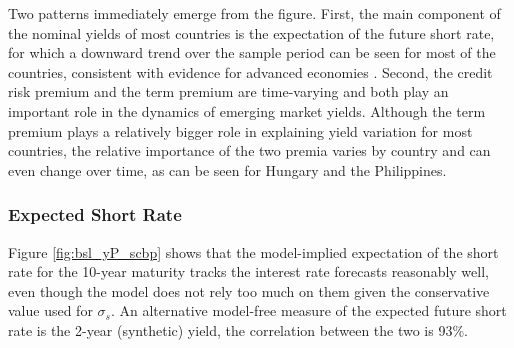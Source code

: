 {Two patterns immediately emerge from the figure. 
First, the main component of the nominal yields of most countries is the expectation of the future short rate, for which a downward trend over the sample period can be seen for most of the countries, consistent with evidence for advanced economies \citep{ACDM:2019}.
Second, the credit risk premium and the term premium are time-varying and both play an important role in the dynamics of emerging market yields.
Although the term premium plays a relatively bigger role 
in explaining yield variation for most countries,
the relative importance of the two premia varies by country and can even change over time, as can be seen for Hungary and the Philippines.


\subsubsection{Expected Short Rate}
\iftoggle{toclinks}{\gototoc}{} %

Figure \ref{fig:bsl_yP_scbp} shows that the model-implied expectation of the short rate for the 10-year maturity tracks the interest rate forecasts reasonably well, even though the model does not rely too much on them given the conservative value used for \(\sigma_s\).
An alternative model-free measure of the expected future short rate is the 2-year (synthetic) yield, the correlation between the two is 93\%.

%	

}
